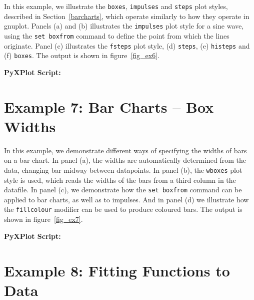 \documentclass[a4paper,onecolumn,11pt]{book}
\begin{document}
\label{example6}

In this example, we illustrate the \texttt{boxes}, \texttt{impulses} and
\texttt{steps} plot styles, described in Section~\ref{barcharts}, which operate
similarly to how they operate in gnuplot. Panels (a) and (b) illustrates the
\texttt{impulses} plot style for a sine wave, using the \texttt{set boxfrom}
command to define the point from which the lines originate. Panel (c)
illustrates the \texttt{fsteps} plot style, (d) \texttt{steps}, (e)
\texttt{histeps} and (f) \texttt{boxes}. The output is shown in
figure~\ref{fig_ex6}.

\vspace{1cm}
\noindent \textbf{PyXPlot Script:}


\newpage
\section{Example 7: Bar Charts -- Box Widths}

\label{example7}

In this example, we demonstrate different ways of specifying the widths of bars
on a bar chart. In panel (a), the widths are automatically determined from the
data, changing bar midway between datapoints. In panel (b), the \texttt{wboxes}
plot style is used, which reads the widths of the bars from a third column in
the datafile. In panel (c), we demonstrate how the \texttt{set boxfrom} command
can be applied to bar charts, as well as to impulses. And in panel (d) we
illustrate how the \texttt{fillcolour} modifier can be used to produce coloured
bars. The output is shown in figure~\ref{fig_ex7}.

\vspace{1cm}
\noindent \textbf{PyXPlot Script:}


\newpage
\section{Example 8: Fitting Functions to Data}
\end{document}
